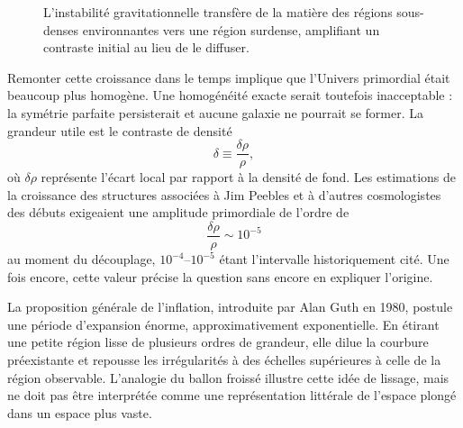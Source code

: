 \begin{figure}[htbp]
\centering
\begin{coursefitfigure}
\end{coursefitfigure}
\caption{L’instabilité gravitationnelle transfère de la matière des régions sous-denses environnantes vers une région surdense, amplifiant un contraste initial au lieu de le diffuser.}
\label{fig:c08-gravity-growth}
\end{figure}

Remonter cette croissance dans le temps implique que l’Univers primordial était beaucoup plus homogène. Une homogénéité exacte serait toutefois inacceptable : la symétrie parfaite persisterait et aucune galaxie ne pourrait se former. La grandeur utile est le contraste de densité
\begin{equation}
\delta\equiv\frac{\delta\rho}{\rho},
\end{equation}
où \(\delta\rho\) représente l’écart local par rapport à la densité de fond. Les estimations de la croissance des structures associées à Jim Peebles et à d’autres cosmologistes des débuts exigeaient une amplitude primordiale de l’ordre de
\begin{equation}
\boxed{\frac{\delta\rho}{\rho}\sim10^{-5}}
\end{equation}au moment du découplage, \(10^{-4}\)--\(10^{-5}\) étant l’intervalle historiquement cité. Une fois encore, cette valeur précise la question sans encore en expliquer l’origine.

La proposition générale de l’inflation, introduite par Alan Guth en 1980, postule une période d’expansion énorme, approximativement exponentielle. En étirant une petite région lisse de plusieurs ordres de grandeur, elle dilue la courbure préexistante et repousse les irrégularités à des échelles supérieures à celle de la région observable. L’analogie du ballon froissé illustre cette idée de lissage, mais ne doit pas être interprétée comme une représentation littérale de l’espace plongé dans un espace plus vaste.

